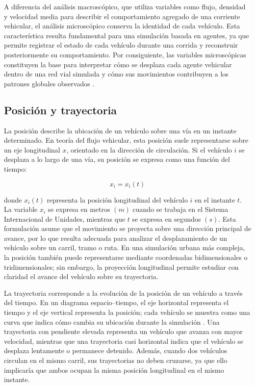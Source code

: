 A diferencia del análisis macroscópico, que utiliza variables como flujo, densidad y velocidad media para describir el comportamiento agregado de una corriente vehicular, el análisis microscópico conserva la identidad de cada vehículo. Esta característica resulta fundamental para una simulación basada en agentes, ya que permite registrar el estado de cada vehículo durante una corrida y reconstruir posteriormente su comportamiento. Por consiguiente, las variables microscópicas constituyen la base para interpretar cómo se desplaza cada agente vehicular dentro de una red vial simulada y cómo sus movimientos contribuyen a los patrones globales observados \cite{fhwa2001trafficflow}.

\subsection{Posición y trayectoria}
\label{subsubsec:posicion_trayectoria}

La posición describe la ubicación de un vehículo sobre una vía en un instante determinado. En teoría del flujo vehicular, esta posición suele representarse sobre un eje longitudinal \(x\), orientado en la dirección de circulación. Si el vehículo \(i\) se desplaza a lo largo de una vía, su posición se expresa como una función del tiempo:

\begin{equation}
x_i = x_i(t)
\label{eq:posicion_trayectoria}
\end{equation}

donde \(x_i(t)\) representa la posición longitudinal del vehículo \(i\) en el instante \(t\). La variable \(x_i\) se expresa en metros \((m)\) cuando se trabaja en el Sistema Internacional de Unidades, mientras que \(t\) se expresa en segundos \((s)\). Esta formulación asume que el movimiento se proyecta sobre una dirección principal de avance, por lo que resulta adecuada para analizar el desplazamiento de un vehículo sobre un carril, tramo o ruta. En una simulación urbana más compleja, la posición también puede representarse mediante coordenadas bidimensionales o tridimensionales; sin embargo, la proyección longitudinal permite estudiar con claridad el avance del vehículo sobre su trayectoria.

La trayectoria corresponde a la evolución de la posición de un vehículo a través del tiempo. En un diagrama espacio--tiempo, el eje horizontal representa el tiempo y el eje vertical representa la posición; cada vehículo se muestra como una curva que indica cómo cambia su ubicación durante la simulación \cite{immers2005trafficflow,fhwa2001trafficflow}. Una trayectoria con pendiente elevada representa un vehículo que avanza con mayor velocidad, mientras que una trayectoria casi horizontal indica que el vehículo se desplaza lentamente o permanece detenido. Además, cuando dos vehículos circulan en el mismo carril, sus trayectorias no deben cruzarse, ya que ello implicaría que ambos ocupan la misma posición longitudinal en el mismo instante.

